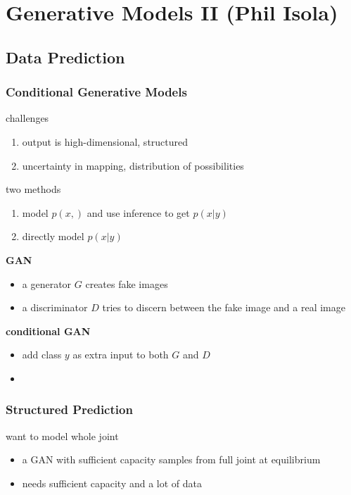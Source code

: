 \documentclass[]{article}
\theoremstyle{definition}
\begin{document}
    \section{Generative Models II {\small(Phil Isola)}}%
    \label{sec:generative_models_ii}

    \subsection{Data Prediction}%
    \label{sub:data_prediction}

    \subsubsection{Conditional Generative Models}%
    \label{ssub:conditional_generative_models}

    challenges
    \begin{enumerate}
        \item output is high-dimensional, structured
        \item uncertainty in mapping, distribution of possibilities
    \end{enumerate}

    two methods
    \begin{enumerate}
        \item model $p(x,)$ and use inference to get $p(x|y)$
        \item directly model $p(x|y)$
    \end{enumerate}

    \textbf{GAN}
    \begin{itemize}
        \item a generator $G$ creates fake images
        \item a discriminator $D$ tries to discern between the fake image and a real image
    \end{itemize}
    \textbf{conditional GAN}
    \begin{itemize}
        \item add class $y$ as extra input to both $G$ and $D$
        \item
    \end{itemize}

    \subsubsection{Structured Prediction}%
    \label{ssub:structured_prediction}

    want to model whole joint
    \begin{itemize}
        \item a GAN with sufficient capacity samples from full joint at equilibrium
        \item needs sufficient capacity and a lot of data
    \end{itemize}
\end{document}

